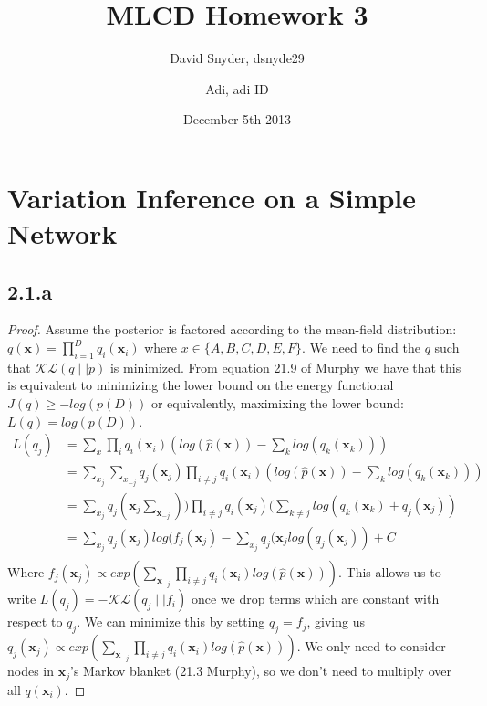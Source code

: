 \documentclass{article}
\title{MLCD Homework 3}
\date{December 5th 2013}
\author{David Snyder, dsnyde29
        \and Adi, adi ID}
\begin{document}
\maketitle

\section*{Variation Inference on a Simple Network}
\subsection*{2.1.a}

\begin{proof}
   Assume the posterior is factored according to the mean-field distribution:
   $q(\textbf{x}) = \prod_{i=1}^{D} q_{i}(\textbf{x}_{i})$ 
   where $x \in \{A,B,C,D,E,F\}$.
   We need to find the $q$ such that $\mathcal{K}\mathcal{L} (q \mid \mid p)$ is minimized.
   From equation 21.9 of Murphy we have that this is equivalent to minimizing the lower
   bound on the energy functional $J(q) \ge -log(p(D))$ or equivalently, maximixing the
   lower bound: $L(q) = log(p(D))$.
  \begin{align*}
     L(q_{j}) &= \sum_{x} \prod_{i} q_{i} (\textbf{x}_{i}) (log(\hat{p} (\textbf{x})) - \sum_{k} log(q_{k} (\textbf{x}_{k}))) \\
     &= \sum_{x_{j}} \sum_{x_{-j}} q_{j} (\textbf{x}_{j}) \prod_{i \ne j} q_{i}(\textbf{x}_{i}) (log(\hat{p}(\textbf{x})) - \sum_{k} log(q_{k}(\textbf{x}_{k}))) \\
     &= \sum_{x_{j}} q_{j}(\textbf{x}_{j} \sum_{\textbf{x}_{-j}})) \prod_{i \ne j} q_{i}(\textbf{x}_{j})(\sum_{k \ne j} log(q_{k}(\textbf{x}_{k}) + q_{j}(\textbf{x}_{j})) \\
     &= \sum_{x_{j}} q_{j}(\textbf{x}_{j}) log(f_{j}(\textbf{x}_{j}) - \sum_{x_{j}} q_{j}(\textbf{x}_{j} log(q_{j}(\textbf{x}_{j})) + C \\
 \end{align*}
 Where $f_{j}(\textbf{x}_{j}) \propto exp(\sum_{\textbf{x}_{-j}} \prod_{i \ne j } q_{i}(\textbf{x}_{i}) log( \hat{p}(\textbf{x})))$.
This allows us to write $L(q_{j}) = - \mathcal{K} \mathcal{L} (q_{j} \mid \mid f_{i})$ once we drop terms which are constant with respect to $q_{j}$. We can minimize this by setting $q_{j} = f_{j}$,
 giving us $q_{j}(\textbf{x}_{j}) \propto exp(\sum_{\textbf{x}_{-j}} \prod_{i \ne j } q_{i}(\textbf{x}_{i}) log( \hat{p}(\textbf{x})))$.
 We only need to consider nodes in $\textbf{x}_{j}$'s Markov blanket (21.3 Murphy), so we don't need to multiply over all $q(\textbf{x}_{i})$.
\end{proof}
\end{document}
